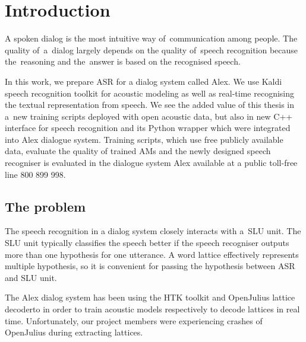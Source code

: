 \chapter{Introduction}
\label{cha:intro}

A spoken dialog is the most intuitive way of~communication among people. 
The quality of~a~dialog largely depends on the quality of~speech recognition because the~reasoning and the~answer is based on the recognised speech. 

In this work, we prepare \acl{ASR} for a dialog system called Alex. 
We use Kaldi speech recognition toolkit\cite{povey2011kaldi} for acoustic modeling as well as real-time recognising the textual representation from speech.
We see the added value of this thesis in a~new training scripts deployed with open acoustic data\cite{korvas_2014}, but also in new C++ interface for speech recognition and its Python wrapper which were integrated into Alex dialogue system. Training scripts, which use free publicly available data, evaluate the quality of trained \aclp{AM} and the newly designed speech recogniser is evaluated in the dialogue system Alex available at a public toll-free line 800 899 998. 


\section{The problem} 
\label{sec:problem}

The speech recognition in a dialog system closely interacts with a~\acl{SLU} unit.
The \ac{SLU} unit typically classifies the speech better if the speech recogniser outputs more than one hypothesis for one utterance. 
A word lattice effectively represents multiple hypothesis, so it is convenient for passing the hypothesis between \ac{ASR} and \ac{SLU} unit.

The Alex dialog system has been using the \ac{HTK} toolkit\cite{young94htk} and OpenJulius\cite{lee2009julius} lattice decoderto in order to train acoustic models respectively to decode lattices in real time. 
Unfortunately, our project members were experiencing crashes of OpenJulius during extracting lattices.

